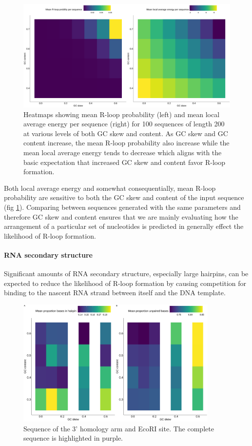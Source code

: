 \documentclass[11pt]{article}
\begin{document}
\begin{figure}[H]
	\includegraphics[width=14cm]{images/plots/rlooper_expect_tile.png}
	\centering
	\caption{Heatmaps showing mean R-loop probability (left) and mean local average energy per sequence (right) for 100 sequences of length 200 at various levels of both GC skew and content. As GC skew and GC content increase, the mean R-loop probability also increase while the mean local average energy tends to decrease which aligns with the basic expectation that increased GC skew and content favor R-loop formation.}
	\label{fig:rlooper-expect}
\end{figure}

Both local average energy and somewhat consequentially, mean R-loop probability are sensitive to both the GC skew and content of the input sequence (fig \ref{fig:rlooper-expect}). Comparing between sequences generated with the same parameters and therefore GC skew and content ensures that we are mainly evaluating how the arrangement of a particular set of nucleotides is predicted in generally effect the likelihood of R-loop formation.



\paragraph{RNA secondary structure}

Significant amounts of RNA secondary structure, especially large hairpins, can be expected to reduce the likelihood of R-loop formation by causing competition for binding to the nascent RNA strand between itself and the DNA template. 


\begin{figure}[H]
	\includegraphics[width=10cm]{images/plots/rna_secondary_structure_temp.png}
	\centering
	\caption{Sequence of the 3' homology arm and EcoRI site. The complete sequence is highlighted in purple.}
	\label{fig:3_prime_arm}
\end{figure}
\end{document}

